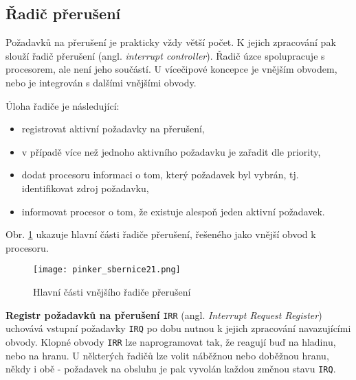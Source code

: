     \subsection{Řadič přerušení}
      Požadavků na přerušení je prakticky vždy větší počet. K jejich zpracování pak slouží řadič 
      přerušení (angl. \emph{interrupt controller}). Řadič úzce spolupracuje s procesorem, ale není 
      jeho součástí. U vícečipové koncepce je vnějším obvodem, nebo je integrován s dalšími 
      vnějšími obvody.
      
      Úloha řadiče je následující:
      \begin{itemize}[noitemsep]
        \item registrovat aktivní požadavky na přerušení,
        \item v případě více než jednoho aktivního požadavku je zařadit dle priority,
        \item dodat procesoru informaci o tom, který požadavek byl vybrán, tj. identifikovat 
              zdroj požadavku,
        \item informovat procesor o tom, že existuje alespoň jeden aktivní požadavek.
      \end{itemize}
    
      Obr. \ref{MIT:fig_sbernice21} ukazuje hlavní části řadiče přerušení, řešeného jako vnější 
      obvod k procesoru.

      \begin{figure}[ht!] %
        \centering
        \texttt{[image: pinker\_sbernice21.png]}
        \caption{Hlavní části vnějšího řadiče přerušení}
        \label{MIT:fig_sbernice21}
      \end{figure}
      
      \textbf{Registr požadavků na přerušení} \texttt{IRR} (angl. \emph{Interrupt Request 
      Register}) uchovává vstupní požadavky \texttt{IRQ} po dobu nutnou k jejich zpracování 
      navazujícími obvody. Klopné obvody \texttt{IRR} lze naprogramovat tak, že reagují buď na 
      hladinu, nebo na hranu. U některých řadičů lze volit náběžnou nebo doběžnou hranu, někdy i 
      obě - požadavek na obsluhu je pak vyvolán každou změnou 
      stavu \texttt{IRQ}.
      
